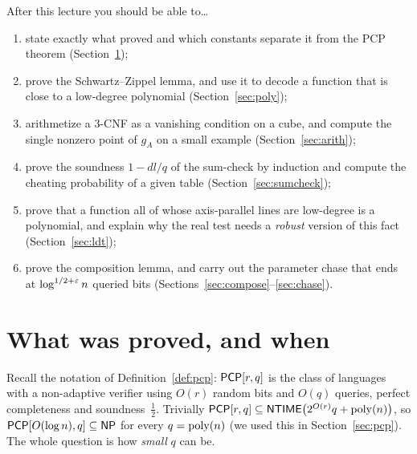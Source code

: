 \begin{goalbox}{After this lecture you should be able to\ldots}
\begin{enumerate}[leftmargin=*,label=(\arabic*)]
  \item state exactly what \citet{AroraSafra98} proved and which constants separate it from the PCP theorem (Section~\ref{sec:as-land});
  \item prove the Schwartz--Zippel lemma, and use it to decode a function that is close to a low-degree polynomial
        (Section~\ref{sec:poly});
  \item arithmetize a $3$-CNF as a vanishing condition on a cube, and compute the single nonzero point of $g_A$ on a
        small example (Section~\ref{sec:arith});
  \item prove the soundness $1-dl/q$ of the sum-check by induction and compute the cheating probability of a given table
        (Section~\ref{sec:sumcheck});
  \item prove that a function all of whose axis-parallel lines are low-degree is a polynomial, and explain why the real test
        needs a \emph{robust} version of this fact (Section~\ref{sec:ldt});
  \item prove the composition lemma, and carry out the parameter chase that ends at $\log^{1/2+\varepsilon}n$ queried bits
        (Sections~\ref{sec:compose}--\ref{sec:chase}).
\end{enumerate}
\end{goalbox}


\section{What was proved, and when}
\label{sec:as-land}

Recall the notation of Definition~\ref{def:pcp}: $\mathsf{PCP}[r,q]$ is the class of languages with a non-adaptive verifier using
$O(r)$ random bits and $O(q)$ queries, perfect completeness and soundness~$\tfrac12$.  Trivially
$\mathsf{PCP}[r,q]\subseteq\mathsf{NTIME}\bigl(2^{O(r)}q+\operatorname{poly}(n)\bigr)$, so $\mathsf{PCP}[O(\log n),q]\subseteq\mathsf{NP}$ for every $q=\operatorname{poly}(n)$ (we used this in
Section~\ref{sec:pcp}).  The whole question is how \emph{small} $q$ can be.

